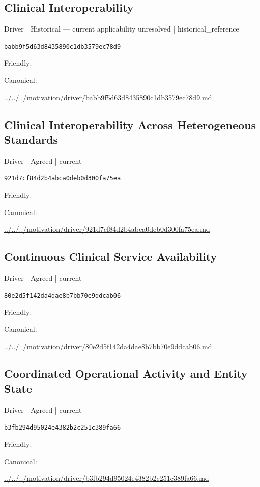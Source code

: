 \documentclass[10pt,a4paper]{article}
\begin{document}
\subsection*{Clinical Interoperability}
{\small Driver | Historical — current applicability unresolved | historical\_reference}\par
\texttt{babb9f5d63d8435890c1db3579ec78d9}\par
Friendly: \par
Canonical: \par
{\footnotesize\url{../../../motivation/driver/babb9f5d63d8435890c1db3579ec78d9.md}}\par
\subsection*{Clinical Interoperability Across Heterogeneous Standards}
{\small Driver | Agreed | current}\par
\texttt{921d7cf84d2b4abca0deb0d300fa75ea}\par
Friendly: \par
Canonical: \par
{\footnotesize\url{../../../motivation/driver/921d7cf84d2b4abca0deb0d300fa75ea.md}}\par
\subsection*{Continuous Clinical Service Availability}
{\small Driver | Agreed | current}\par
\texttt{80e2d5f142da4dae8b7bb70e9ddcab06}\par
Friendly: \par
Canonical: \par
{\footnotesize\url{../../../motivation/driver/80e2d5f142da4dae8b7bb70e9ddcab06.md}}\par
\subsection*{Coordinated Operational Activity and Entity State}
{\small Driver | Agreed | current}\par
\texttt{b3fb294d95024e4382b2c251c389fa66}\par
Friendly: \par
Canonical: \par
{\footnotesize\url{../../../motivation/driver/b3fb294d95024e4382b2c251c389fa66.md}}\par
\end{document}
